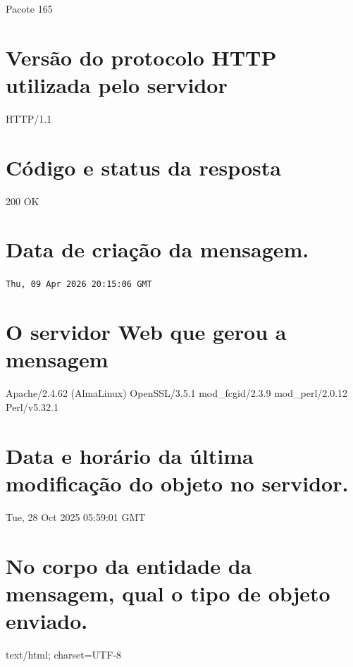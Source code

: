 
\begin{solution}
Pacote 165    
\end{solution}

\begin{parts}
    \part{Versão do protocolo HTTP utilizada pelo servidor}
    \begin{solution}
    HTTP/1.1
    \end{solution}

    \part{Código e status da resposta}
    \begin{solution}
    200 OK
    \end{solution}

    \part{Data de criação da mensagem.}
    \begin{solution}
    \texttt{Thu, 09 Apr 2026 20:15:06 GMT}
    \end{solution}

    \part{O servidor Web que gerou a mensagem}
    \begin{solution}
    Apache/2.4.62 (AlmaLinux) OpenSSL/3.5.1 mod\_fcgid/2.3.9 mod\_perl/2.0.12 Perl/v5.32.1            
    \end{solution}

    \part{Data e horário da última modificação do objeto no servidor.}
    \begin{solution}
    Tue, 28 Oct 2025 05:59:01 GMT            
    \end{solution}

    \part{No corpo da entidade da mensagem, qual o tipo de objeto enviado.}
    \begin{solution}
    text/html; charset=UTF-8
    \end{solution}
        


\end{parts}
